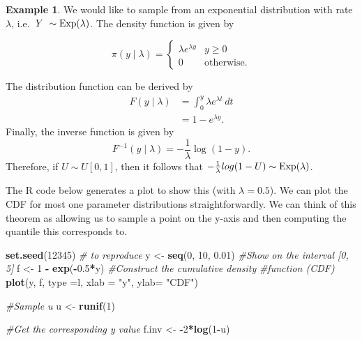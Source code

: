 \documentclass[
]{book}
\newenvironment{Shaded}{\begin{snugshade}}{\end{snugshade}}
\newcommand{\AttributeTok}[1]{\textcolor[rgb]{0.13,0.29,0.53}{#1}}
\newcommand{\CommentTok}[1]{\textcolor[rgb]{0.56,0.35,0.01}{\textit{#1}}}
\newcommand{\DecValTok}[1]{\textcolor[rgb]{0.00,0.00,0.81}{#1}}
\newcommand{\FloatTok}[1]{\textcolor[rgb]{0.00,0.00,0.81}{#1}}
\newcommand{\FunctionTok}[1]{\textcolor[rgb]{0.13,0.29,0.53}{\textbf{#1}}}
\newcommand{\NormalTok}[1]{#1}
\newcommand{\OtherTok}[1]{\textcolor[rgb]{0.56,0.35,0.01}{#1}}
\newcommand{\SpecialCharTok}[1]{\textcolor[rgb]{0.81,0.36,0.00}{\textbf{#1}}}
\newcommand{\StringTok}[1]{\textcolor[rgb]{0.31,0.60,0.02}{#1}}
\theoremstyle{definition}
\theoremstyle{definition}
\newtheorem{example}{Example}[chapter]
\theoremstyle{definition}
\theoremstyle{definition}
\theoremstyle{remark}
\begin{document}
\begin{example}
We would like to sample from an exponential distribution with rate \(\lambda\), i.e.~\(Y ~ \sim \hbox{Exp}(\lambda)\). The density function is given by

\[
\pi(y \mid \lambda) = \begin{cases} 
      \lambda e^{\lambda y} & y \geq 0 \\
    0  & \text{otherwise.}
   \end{cases}
\]

The distribution function can be derived by
\begin{align*}
F(y \mid \lambda) &= \int_0^y \lambda e^{\lambda t}\,dt \\
& =  1 - e^{\lambda y}.
\end{align*}
Finally, the inverse function is given by
\[
F^{-1}(y \mid \lambda) = -\frac{1}{\lambda}\log(1-y).  
\]
Therefore, if \(U \sim U[0, 1]\), then it follows that \(-\frac{1}{\lambda}log(1-U) \sim \hbox{Exp}(\lambda)\).

The R code below generates a plot to show this (with \(\lambda = 0.5\)). We can plot the CDF for most one parameter distributions straightforwardly. We can think of this theorem as allowing us to sample a point on the y-axis and then computing the quantile this corresponds to.

\begin{Shaded}
\begin{Highlighting}[]
\FunctionTok{set.seed}\NormalTok{(}\DecValTok{12345}\NormalTok{) }\CommentTok{\# to reproduce}
\NormalTok{y }\OtherTok{\textless{}{-}} \FunctionTok{seq}\NormalTok{(}\DecValTok{0}\NormalTok{, }\DecValTok{10}\NormalTok{, }\FloatTok{0.01}\NormalTok{) }\CommentTok{\#Show on the interval [0, 5]}
\NormalTok{f }\OtherTok{\textless{}{-}} \DecValTok{1} \SpecialCharTok{{-}} \FunctionTok{exp}\NormalTok{(}\SpecialCharTok{{-}}\FloatTok{0.5}\SpecialCharTok{*}\NormalTok{y)    }\CommentTok{\#Construct the cumulative density }
                        \CommentTok{\#function (CDF)}
\FunctionTok{plot}\NormalTok{(y, f, }\AttributeTok{type =}\StringTok{\textquotesingle{}l\textquotesingle{}}\NormalTok{, }\AttributeTok{xlab =} \StringTok{"y"}\NormalTok{, }\AttributeTok{ylab=} \StringTok{"CDF"}\NormalTok{)}

\CommentTok{\#Sample u}
\NormalTok{u }\OtherTok{\textless{}{-}} \FunctionTok{runif}\NormalTok{(}\DecValTok{1}\NormalTok{)}

\CommentTok{\#Get the corresponding y value}
\NormalTok{f.inv }\OtherTok{\textless{}{-}} \SpecialCharTok{{-}}\DecValTok{2}\SpecialCharTok{*}\FunctionTok{log}\NormalTok{(}\DecValTok{1}\SpecialCharTok{{-}}\NormalTok{u)}


\end{Highlighting}
\end{Shaded}
\end{example}
\end{document}
